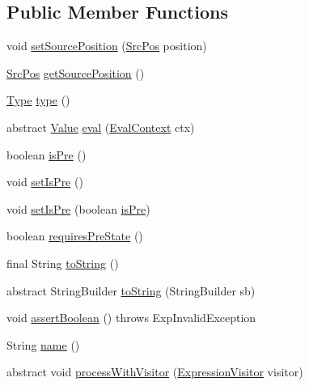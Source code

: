 \subsection*{Public Member Functions}
\begin{DoxyCompactItemize}
\item 
void \hyperlink{classorg_1_1tzi_1_1use_1_1uml_1_1ocl_1_1expr_1_1_expression_a46931d7312e8dd9fbba78bc5a99a2032}{set\-Source\-Position} (\hyperlink{classorg_1_1tzi_1_1use_1_1parser_1_1_src_pos}{Src\-Pos} position)
\item 
\hyperlink{classorg_1_1tzi_1_1use_1_1parser_1_1_src_pos}{Src\-Pos} \hyperlink{classorg_1_1tzi_1_1use_1_1uml_1_1ocl_1_1expr_1_1_expression_abc4079ca3186c14d36fdb19b5c94634e}{get\-Source\-Position} ()
\item 
\hyperlink{interfaceorg_1_1tzi_1_1use_1_1uml_1_1ocl_1_1type_1_1_type}{Type} \hyperlink{classorg_1_1tzi_1_1use_1_1uml_1_1ocl_1_1expr_1_1_expression_a58f6de636b40c462ceb798428665ff24}{type} ()
\item 
abstract \hyperlink{classorg_1_1tzi_1_1use_1_1uml_1_1ocl_1_1value_1_1_value}{Value} \hyperlink{classorg_1_1tzi_1_1use_1_1uml_1_1ocl_1_1expr_1_1_expression_a0befecbb9aa440db69e83e5cb247b496}{eval} (\hyperlink{classorg_1_1tzi_1_1use_1_1uml_1_1ocl_1_1expr_1_1_eval_context}{Eval\-Context} ctx)
\item 
boolean \hyperlink{classorg_1_1tzi_1_1use_1_1uml_1_1ocl_1_1expr_1_1_expression_a25255b8635adfd1255d5fddfd6254833}{is\-Pre} ()
\item 
void \hyperlink{classorg_1_1tzi_1_1use_1_1uml_1_1ocl_1_1expr_1_1_expression_a19f64ce541eecb13f953ca6bd6ad4aa3}{set\-Is\-Pre} ()
\item 
void \hyperlink{classorg_1_1tzi_1_1use_1_1uml_1_1ocl_1_1expr_1_1_expression_a80b92a55cdb950addc8865c5729fce43}{set\-Is\-Pre} (boolean \hyperlink{classorg_1_1tzi_1_1use_1_1uml_1_1ocl_1_1expr_1_1_expression_a25255b8635adfd1255d5fddfd6254833}{is\-Pre})
\item 
boolean \hyperlink{classorg_1_1tzi_1_1use_1_1uml_1_1ocl_1_1expr_1_1_expression_a925f33f46238c1e03afe64b9dcfc883e}{requires\-Pre\-State} ()
\item 
final String \hyperlink{classorg_1_1tzi_1_1use_1_1uml_1_1ocl_1_1expr_1_1_expression_a01192513b1b1adbc44727a67ae14d02e}{to\-String} ()
\item 
abstract String\-Builder \hyperlink{classorg_1_1tzi_1_1use_1_1uml_1_1ocl_1_1expr_1_1_expression_a45869cd705884a7d4626cf54dd450bcd}{to\-String} (String\-Builder sb)
\item 
void \hyperlink{classorg_1_1tzi_1_1use_1_1uml_1_1ocl_1_1expr_1_1_expression_ac49a64563e741765fc424c734a29b251}{assert\-Boolean} ()  throws Exp\-Invalid\-Exception 
\item 
String \hyperlink{classorg_1_1tzi_1_1use_1_1uml_1_1ocl_1_1expr_1_1_expression_a8b417bad725e051599b56a0ba14d8bed}{name} ()
\item 
abstract void \hyperlink{classorg_1_1tzi_1_1use_1_1uml_1_1ocl_1_1expr_1_1_expression_ad39b84e70f5bdcd31e861b5f933ca106}{process\-With\-Visitor} (\hyperlink{interfaceorg_1_1tzi_1_1use_1_1uml_1_1ocl_1_1expr_1_1_expression_visitor}{Expression\-Visitor} visitor)
\end{DoxyCompactItemize}
